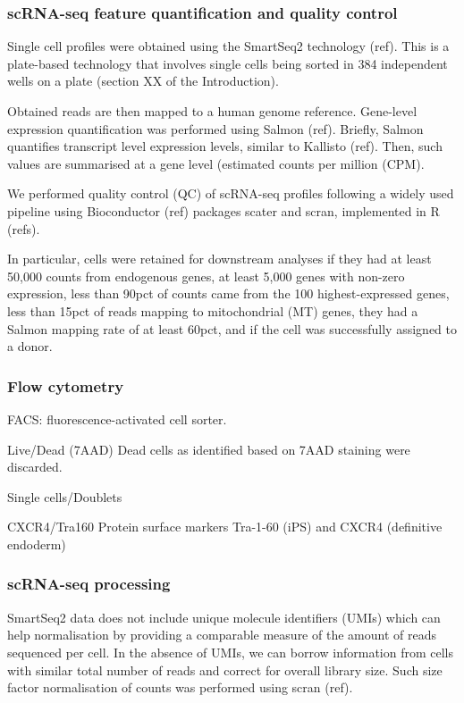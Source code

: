 \subsubsection{scRNA-seq feature quantification and quality control}

Single cell profiles were obtained using the SmartSeq2 technology (ref). This is a plate-based technology that involves single cells being sorted in 384 independent wells on a plate (section XX of the Introduction). 

Obtained reads are then mapped to a human genome reference. Gene-level expression quantification was performed using Salmon (ref). Briefly, Salmon quantifies transcript level expression levels, similar to Kallisto (ref). Then, such values are summarised at a gene level (estimated counts per million (CPM).

We performed quality control (QC) of scRNA-seq profiles following a widely used pipeline using Bioconductor (ref) packages scater and scran, implemented in R (refs).  

In particular, cells were retained for downstream analyses if they had at least 50,000 counts from endogenous genes, at least 5,000 genes with non-zero expression, less than 90pct of counts came from the 100 highest-expressed genes, less than 15pct of reads mapping to mitochondrial (MT) genes, they had a Salmon mapping rate of at least 60pct, and if the cell was successfully assigned to a donor. 

\subsubsection{Flow cytometry}

FACS: fluorescence-activated cell sorter.

Live/Dead (7AAD)
Dead cells as identified based on 7AAD staining were discarded. 

Single cells/Doublets

CXCR4/Tra160 
Protein surface markers Tra-1-60 (iPS) and CXCR4 (definitive endoderm)

\subsubsection{scRNA-seq processing}

SmartSeq2 data does not include unique molecule identifiers (UMIs) which can help normalisation by providing a comparable measure of the amount of reads sequenced per cell. In the absence of UMIs, we can borrow information from cells with similar total number of reads and correct for overall library size. Such size factor normalisation of counts was performed using scran (ref). 

